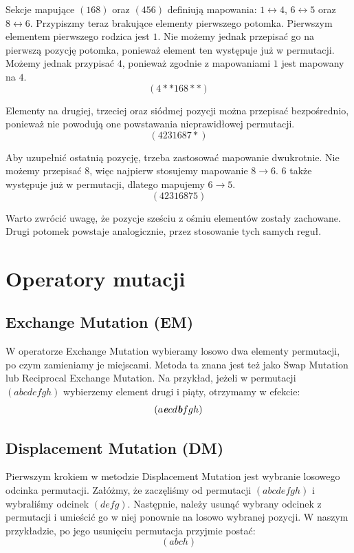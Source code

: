 \documentclass[brudnopis]{xmgr}
\begin{document}
Sekcje mapujące $ (1 6 8) $ oraz $ (4 5 6) $ definiują mapowania: $ 1 \leftrightarrow 4 $, $ 6 \leftrightarrow 5 $ oraz $ 8 \leftrightarrow 6 $. Przypiszmy teraz brakujące elementy pierwszego potomka. Pierwszym elementem pierwszego rodzica jest $1$. Nie możemy jednak przepisać go na pierwszą pozycję potomka, ponieważ element ten występuje już w permutacji. Możemy jednak przypisać $4$, ponieważ zgodnie z mapowaniami $1$ jest mapowany na $4$.
$$ (4 * * 1 6 8 * *) $$

Elementy na drugiej, trzeciej oraz siódmej pozycji można przepisać bezpośrednio, ponieważ nie powodują one powstawania nieprawidłowej permutacji.
$$ (4 2 3 1 6 8 7 *) $$

Aby uzupełnić ostatnią pozycję, trzeba zastosować mapowanie dwukrotnie. Nie możemy przepisać $8$, więc najpierw stosujemy mapowanie $8 \rightarrow 6$. $6$ także występuje już w permutacji, dlatego mapujemy $6 \rightarrow 5$.
$$ (4 2 3 1 6 8 7 5) $$

Warto zwrócić uwagę, że pozycje sześciu z ośmiu elementów zostały zachowane. Drugi potomek powstaje analogicznie, przez stosowanie tych samych reguł.


\section{Operatory mutacji}

\subsection{Exchange Mutation (EM)}

W operatorze Exchange Mutation wybieramy losowo dwa elementy permutacji, po czym zamieniamy je miejscami. Metoda ta znana jest też jako Swap Mutation lub Reciprocal Exchange Mutation. Na przykład, jeżeli w permutacji $ (a b c d e f g h) $ wybierzemy element drugi i piąty, otrzymamy w efekcie:
$$ (a \textit{\textbf{e}} c d \textit{\textbf{b}} f g h) $$

\subsection{Displacement Mutation (DM)}

Pierwszym krokiem w metodzie Displacement Mutation jest wybranie losowego odcinka permutacji. Załóżmy, że zaczęliśmy od permutacji $ (a b c d e f g h) $ i wybraliśmy odcinek $ (d e f g) $. Następnie, należy usunąć wybrany odcinek z permutacji i umieścić go w niej ponownie na losowo wybranej pozycji. W naszym przykładzie, po jego usunięciu permutacja przyjmie postać:
$$ (a b c h) $$
\end{document}
